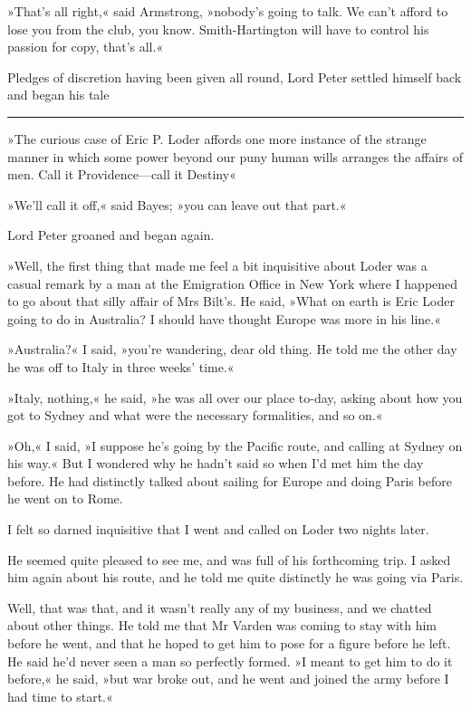 »That's all right,« said Armstrong, »nobody's going to talk. We can't afford to lose you from the club, you know. Smith-Hartington will have to control his passion for copy, that's all.«

Pledges of discretion having been given all round, Lord Peter settled himself back and began his tale

\noindent\hfil\rule{0.5\textwidth}{.4pt}\hfil 

»The curious case of Eric P. Loder affords one more instance of the strange manner in which some power beyond our puny human wills arranges the affairs of men. Call it Providence—call it Destiny\longdash«

»We'll call it off,« said Bayes; »you can leave out that part.«

Lord Peter groaned and began again.

»Well, the first thing that made me feel a bit inquisitive about Loder was a casual remark by a man at the Emigration Office in New York where I happened to go about that silly affair of Mrs Bilt's. He said, »What on earth is Eric Loder going to do in Australia? I should have thought Europe was more in his line.«

»Australia?« I said, »you're wandering, dear old thing. He told me the other day he was off to Italy in three weeks' time.«

»Italy, nothing,« he said, »he was all over our place to-day, asking about how you got to Sydney and what were the necessary formalities, and so on.«

»Oh,« I said, »I suppose he's going by the Pacific route, and calling at Sydney on his way.« But I wondered why he hadn't said so when I'd met him the day before. He had distinctly talked about sailing for Europe and doing Paris before he went on to Rome.

I felt so darned inquisitive that I went and called on Loder two nights later.

He seemed quite pleased to see me, and was full of his forthcoming trip. I asked him again about his route, and he told me quite distinctly he was going via Paris.

Well, that was that, and it wasn't really any of my business, and we chatted about other things. He told me that Mr Varden was coming to stay with him before he went, and that he hoped to get him to pose for a figure before he left. He said he'd never seen a man so perfectly formed. »I meant to get him to do it before,« he said, »but war broke out, and he went and joined the army before I had time to start.«

